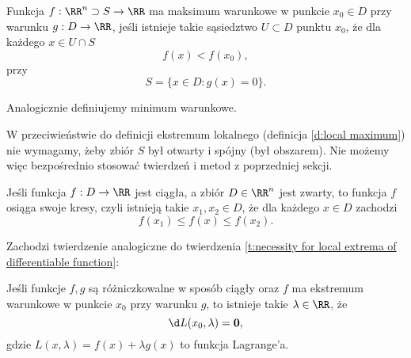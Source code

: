 \begin{definition}
    Funkcja $f : \RR^n \supset S \to \RR$ ma maksimum warunkowe w punkcie $x_0 \in D$ przy warunku $g : D \to \RR$, jeśli istnieje takie sąsiedztwo $U \subset D$ punktu $x_0$, że dla każdego $x \in U \cap S$
    \[ f(x) < f(x_0), \]
    przy
    \[ S = \{x \in D : g(x) = 0\}. \]
\end{definition}

Analogicznie definiujemy minimum warunkowe.

\begin{remark*}
    W przeciwieństwie do definicji ekstremum lokalnego (definicja \ref{d:local maximum}) nie wymagamy, żeby zbiór $S$ był otwarty i spójny (był obszarem). Nie możemy więc bezpośrednio stosować twierdzeń i metod z poprzedniej sekcji.
\end{remark*}

\begin{theorem}
    \label{t:Weierstrass}
    Jeśli funkcja $f : D \to \RR$ jest ciągła, a zbiór $D \in \RR^n$ jest zwarty, to funkcja $f$ osiąga swoje kresy, czyli istnieją takie $x_1, x_2 \in D$, że dla każdego $x \in D$ zachodzi
    \[ f(x_1) \leq f(x) \leq f(x_2). \]
\end{theorem}

Zachodzi twierdzenie analogiczne do twierdzenia \ref{t:necessity for local extrema of differentiable function}:

\begin{theorem}
    \label{t:necessity for conditional extrema of differentiable function}
    Jeśli funkcje $f, g$ są różniczkowalne w sposób ciągły oraz $f$ ma ekstremum warunkowe w punkcie $x_0$ przy warunku $g$, to istnieje takie $\lambda \in \RR$, że
    \[ \d L(x_0, \lambda) = \mathbf{0}, \]
    gdzie $L(x, \lambda) = f(x) + \lambda g(x)$ to funkcja Lagrange'a.
\end{theorem}

